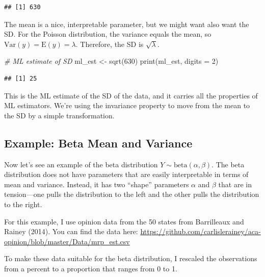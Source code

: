 \documentclass[
]{book}
\newenvironment{Shaded}{\begin{snugshade}}{\end{snugshade}}
\newcommand{\AttributeTok}[1]{\textcolor[rgb]{0.77,0.63,0.00}{#1}}
\newcommand{\CommentTok}[1]{\textcolor[rgb]{0.56,0.35,0.01}{\textit{#1}}}
\newcommand{\DecValTok}[1]{\textcolor[rgb]{0.00,0.00,0.81}{#1}}
\newcommand{\FunctionTok}[1]{\textcolor[rgb]{0.00,0.00,0.00}{#1}}
\newcommand{\NormalTok}[1]{#1}
\newcommand{\OtherTok}[1]{\textcolor[rgb]{0.56,0.35,0.01}{#1}}
\begin{document}
\begin{verbatim}
## [1] 630
\end{verbatim}

The mean is a nice, interpretable parameter, but we might want also want the SD. For the Poisson distribution, the variance equals the mean, so \(\text{Var}(y) = \text{E}(y) = \lambda\). Therefore, the SD is \(\sqrt{\lambda}\).

\begin{Shaded}
\begin{Highlighting}[]
\CommentTok{\# ML estimate of SD}
\NormalTok{ml\_est }\OtherTok{\textless{}{-}} \FunctionTok{sqrt}\NormalTok{(}\DecValTok{630}\NormalTok{)}
\FunctionTok{print}\NormalTok{(ml\_est, }\AttributeTok{digits =} \DecValTok{2}\NormalTok{)}
\end{Highlighting}
\end{Shaded}

\begin{verbatim}
## [1] 25
\end{verbatim}

This is the ML estimate of the SD of the data, and it carries all the properties of ML estimators. We're using the invariance property to move from the mean to the SD by a simple transformation.

\hypertarget{example-beta-mean-and-variance}{%
\subsection{Example: Beta Mean and Variance}\label{example-beta-mean-and-variance}}

Now let's see an example of the beta distribution \(Y \sim \text{beta}(\alpha, \beta)\). The beta distribution does not have parameters that are easily interpretable in terms of mean and variance. Instead, it has two ``shape'' parameters \(\alpha\) and \(\beta\) that are in tension---one pulls the distribution to the left and the other pulls the distribution to the right.

For this example, I use opinion data from the 50 states from Barrilleaux and Rainey (2014). You can find the data here: \url{https://github.com/carlislerainey/aca-opinion/blob/master/Data/mrp_est.csv}

To make these data suitable for the beta distribution, I rescaled the observations from a percent to a proportion that ranges from 0 to 1.
\end{document}
